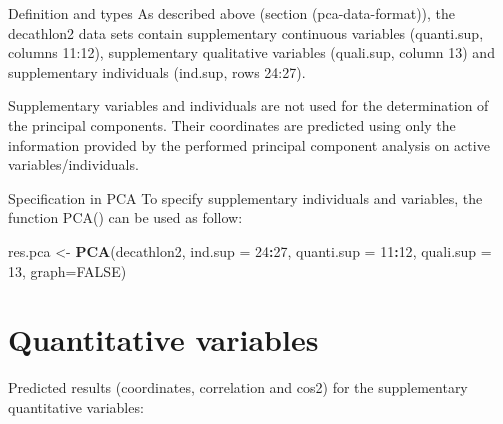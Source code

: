 \documentclass[]{book}
\newenvironment{Shaded}{\begin{snugshade}}{\end{snugshade}}
\newcommand{\CommentTok}[1]{\textcolor[rgb]{0.56,0.35,0.01}{\textit{#1}}}
\newcommand{\DataTypeTok}[1]{\textcolor[rgb]{0.13,0.29,0.53}{#1}}
\newcommand{\DecValTok}[1]{\textcolor[rgb]{0.00,0.00,0.81}{#1}}
\newcommand{\KeywordTok}[1]{\textcolor[rgb]{0.13,0.29,0.53}{\textbf{#1}}}
\newcommand{\NormalTok}[1]{#1}
\newcommand{\OperatorTok}[1]{\textcolor[rgb]{0.81,0.36,0.00}{\textbf{#1}}}
\newcommand{\OtherTok}[1]{\textcolor[rgb]{0.56,0.35,0.01}{#1}}
\newcommand{\StringTok}[1]{\textcolor[rgb]{0.31,0.60,0.02}{#1}}
\begin{document}
Definition and types
As described above (section \citet{ref}(pca-data-format)), the decathlon2 data sets contain supplementary continuous variables (quanti.sup, columns 11:12), supplementary qualitative variables (quali.sup, column 13) and supplementary individuals (ind.sup, rows 24:27).

Supplementary variables and individuals are not used for the determination of the principal components. Their coordinates are predicted using only the information provided by the performed principal component analysis on active variables/individuals.

Specification in PCA
To specify supplementary individuals and variables, the function PCA() can be used as follow:

\begin{Shaded}
\begin{Highlighting}[]
\NormalTok{res.pca <-}\StringTok{ }\KeywordTok{PCA}\NormalTok{(decathlon2, }\DataTypeTok{ind.sup =} \DecValTok{24}\OperatorTok{:}\DecValTok{27}\NormalTok{, }
               \DataTypeTok{quanti.sup =} \DecValTok{11}\OperatorTok{:}\DecValTok{12}\NormalTok{, }\DataTypeTok{quali.sup =} \DecValTok{13}\NormalTok{, }\DataTypeTok{graph=}\OtherTok{FALSE}\NormalTok{)}
\end{Highlighting}
\end{Shaded}

\hypertarget{quantitative-variables-1}{%
\section{Quantitative variables}\label{quantitative-variables-1}}

Predicted results (coordinates, correlation and cos2) for the supplementary quantitative variables:

\begin{Shaded}
\end{Shaded}
\end{document}
